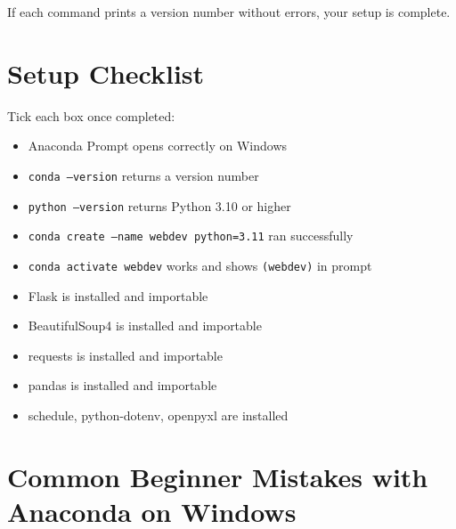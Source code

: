 \documentclass[12pt, a4paper]{book}
\begin{document}
If each command prints a version number without errors, your setup is complete.

\section{Setup Checklist}

\begin{tcolorbox}[notebox, title={✅ Setup Checklist}]
Tick each box once completed:
\begin{itemize}[label=\(\square\)]
  \item Anaconda Prompt opens correctly on Windows
  \item \texttt{conda --version} returns a version number
  \item \texttt{python --version} returns Python 3.10 or higher
  \item \texttt{conda create --name webdev python=3.11} ran successfully
  \item \texttt{conda activate webdev} works and shows \texttt{(webdev)} in prompt
  \item Flask is installed and importable
  \item BeautifulSoup4 is installed and importable
  \item requests is installed and importable
  \item pandas is installed and importable
  \item schedule, python-dotenv, openpyxl are installed
\end{itemize}
\end{tcolorbox}

\section{Common Beginner Mistakes with Anaconda on Windows}
\end{document}
